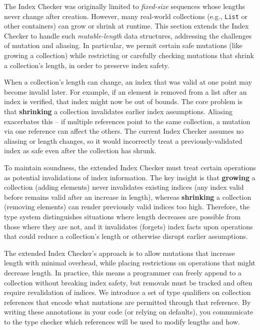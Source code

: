 The Index Checker was originally limited to \emph{fixed-size} sequences whose
lengths never change after creation. However, many real-world collections
(e.g., {\tt List} or other containers) can grow or shrink at runtime.
This section extends the Index Checker to handle such \emph{mutable-length} data
structures, addressing the challenges of mutation and aliasing. In particular,
we permit certain safe mutations (like growing a collection) while restricting or
carefully checking mutations that shrink a collection’s length, in order to
preserve index safety.


When a collection’s length can change, an index that was valid at one point may
become invalid later. For example, if an element is removed from a list after
an index is verified, that index might now be out of bounds. The core problem is
that \textbf{shrinking} a collection invalidates earlier index assumptions.
Aliasing exacerbates this – if multiple references point to the same collection,
a mutation via one reference can affect the others. The current Index Checker
assumes no aliasing or length changes, so it would incorrectly treat a
previously-validated index as safe even after the collection has shrunk.

To maintain soundness, the extended Index Checker must treat certain operations
as potential invalidations of index information. The key insight is that
\textbf{growing} a collection (adding elements) never invalidates existing indices
(any index valid before remains valid after an increase in length), whereas
\textbf{shrinking} a collection (removing elements) can render previously valid
indices too high. Therefore, the type system distinguishes situations where length
decreases are possible from those where they are not, and it invalidates (forgets)
index facts upon operations that could reduce a collection’s length or otherwise
disrupt earlier assumptions.


The extended Index Checker’s approach is to allow mutations that increase length
with minimal overhead, while placing restrictions on operations that might decrease
length. In practice, this means a programmer can freely append to a collection without
breaking index safety, but removals must be tracked and often require revalidation of
indices. We introduce a set of type qualifiers on collection references that encode
what mutations are permitted through that reference. By writing these annotations
in your code (or relying on defaults), you communicate to the type checker which
references will be used to modify lengths and how.

